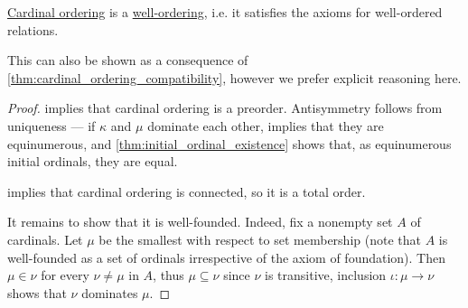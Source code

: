 \begin{proposition}\label{thm:cardinal_ordering_is_well_ordering}
  \hyperref[def:cardinal_ordering]{Cardinal ordering} is a \hyperref[def:well_ordered_set]{well-ordering}, i.e. it satisfies the axioms for well-ordered relations.
\end{proposition}
\begin{comments}
  \item This can also be shown as a consequence of \cref{thm:cardinal_ordering_compatibility}, however we prefer explicit reasoning here.
\end{comments}
\begin{proof}
   implies that cardinal ordering is a preorder. Antisymmetry follows from uniqueness --- if \( \kappa \) and \( \mu \) dominate each other,  implies that they are equinumerous, and \cref{thm:initial_ordinal_existence} shows that, as equinumerous initial ordinals, they are equal.

   implies that cardinal ordering is connected, so it is a total order.

  It remains to show that it is well-founded. Indeed, fix a nonempty set \( A \) of cardinals. Let \( \mu \) be the smallest with respect to set membership (note that \( A \) is well-founded as a set of ordinals irrespective of the axiom of foundation). Then \( \mu \in \nu \) for every \( \nu \neq \mu \) in \( A \), thus \( \mu \subseteq \nu \) since \( \nu \) is transitive, inclusion \( \iota: \mu \to \nu \) shows that \( \nu \) dominates \( \mu \).
\end{proof}

